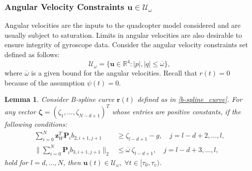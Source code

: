 \documentclass[journal,10pt]{IEEEtran}
\newtheorem{lemma}{\bfseries Lemma}%
\newcommand{\vect}[1]{\boldsymbol{\mathbf{#1}}}
\begin{document}
\subsubsection{Angular Velocity Constraints $\vect{u}\in\mathcal{U}_{\omega}$} 
Angular velocities are the inputs to the quadcopter model considered and are usually subject to saturation. Limits in angular velocities are also desirable to ensure integrity of gyroscope data. Consider the angular velocity constraints set defined as follows:
\begin{equation}\label{const_dang}
    \mathcal{U}_{\omega} = \{\vect{u}\in\mathbb{R}^4:|p|,|q| \leq \overline{\omega}\},
\end{equation}
where $\overline{\omega}$ is a given bound for the angular velocities. Recall that $r(t)=0$ because of the assumption $\psi(t) = 0$. 
\begin{lemma}\label{lemangular}
Consider B-spline curve $\vect{r}(t)$ defined as in \eqref{b-spline_curve}. For any vector  $\vect{\zeta}=(\zeta_1,...,\zeta_{N-d+1})^T$ whose entries are positive constants, if the following conditions:
\begin{subequations} \label{cp_omega}
\begin{align}
    \sum_{i=0}^N\vect{z}_W^T\vect{P}_ib_{2,i+1,j+1} &\geq \zeta_{l-d+1}-g,\quad j = l-d+2,\ldots,l, \label{cp_omega_Tmin}\\
    \bigg\|\sum_{i=0}^N\vect{P}_ib_{3,i+1,j+1}\bigg\|_2 &\leq \overline{\omega}\ \zeta_{l-d+1},\quad j=l-d+3,\ldots,l,\label{cp_omega_jerk}
\end{align}
\end{subequations}
hold for $l=d,\ldots,N$, then $\vect{u}(t)\in\mathcal{U}_{\omega},\; \forall t\in[\tau_0,\tau_v)$.
\end{lemma}
\end{document}
